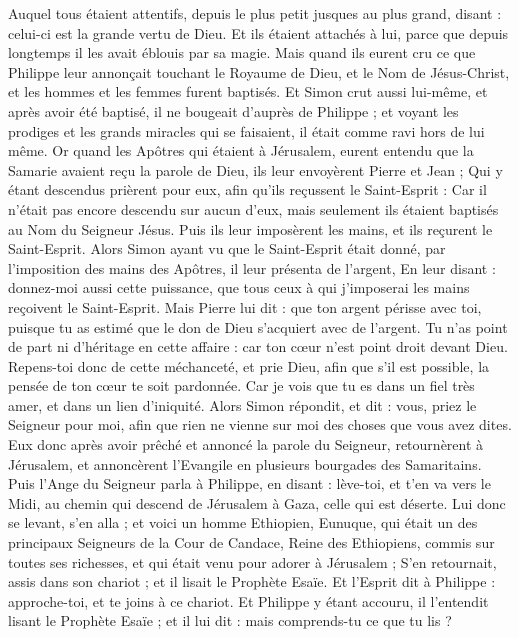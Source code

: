 \begin{multicols}{2}
Auquel tous étaient attentifs, depuis le plus petit jusques au plus grand, disant : celui-ci est la grande vertu de Dieu.
Et ils étaient attachés à lui, parce que depuis longtemps il les avait éblouis par sa magie.
Mais quand ils eurent cru ce que Philippe leur annonçait touchant le Royaume de Dieu, et le Nom de Jésus-Christ, et les hommes et les femmes furent baptisés.
Et Simon crut aussi lui-même, et après avoir été baptisé, il ne bougeait d'auprès de Philippe ; et voyant les prodiges et les grands miracles qui se faisaient, il était comme ravi hors de lui même.
Or quand les Apôtres qui étaient à Jérusalem, eurent entendu que la Samarie avaient reçu la parole de Dieu, ils leur envoyèrent Pierre et Jean ;
Qui y étant descendus prièrent pour eux, afin qu'ils reçussent le Saint-Esprit :
Car il n'était pas encore descendu sur aucun d'eux, mais seulement ils étaient baptisés au Nom du Seigneur Jésus.
Puis ils leur imposèrent les mains, et ils reçurent le Saint-Esprit.
Alors Simon ayant vu que le Saint-Esprit était donné, par l'imposition des mains des Apôtres, il leur présenta de l'argent,
En leur disant : donnez-moi aussi cette puissance, que tous ceux à qui j'imposerai les mains reçoivent le Saint-Esprit.
Mais Pierre lui dit : que ton argent périsse avec toi, puisque tu as estimé que le don de Dieu s'acquiert avec de l'argent.
Tu n'as point de part ni d'héritage en cette affaire : car ton cœur n'est point droit devant Dieu.
Repens-toi donc de cette méchanceté, et prie Dieu, afin que s'il est possible, la pensée de ton cœur te soit pardonnée.
Car je vois que tu es dans un fiel très amer, et dans un lien d'iniquité.
Alors Simon répondit, et dit : vous, priez le Seigneur pour moi, afin que rien ne vienne sur moi des choses que vous avez dites.
Eux donc après avoir prêché et annoncé la parole du Seigneur, retournèrent à Jérusalem, et annoncèrent l'Evangile en plusieurs bourgades des Samaritains.
Puis l'Ange du Seigneur parla à Philippe, en disant : lève-toi, et t'en va vers le Midi, au chemin qui descend de Jérusalem à Gaza, celle qui est déserte.
Lui donc se levant, s'en alla ; et voici un homme Ethiopien, Eunuque, qui était un des principaux Seigneurs de la Cour de Candace, Reine des Ethiopiens, commis sur toutes ses richesses, et qui était venu pour adorer à Jérusalem ;
S'en retournait, assis dans son chariot ; et il lisait le Prophète Esaïe.
Et l'Esprit dit à Philippe : approche-toi, et te joins à ce chariot.
Et Philippe y étant accouru, il l'entendit lisant le Prophète Esaïe ; et il lui dit : mais comprends-tu ce que tu lis ?

\end{multicols}
